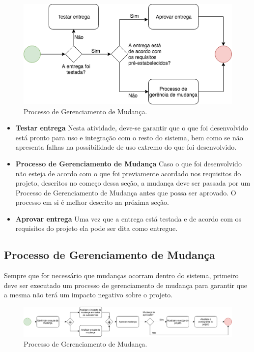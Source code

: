 \begin{figure}[!ht]
	\centering
		\includegraphics[scale=0.7]{figuras/entrega}
	\caption{Processo de Gerenciamento de Mudança.}
\end{figure}

\begin{itemize}
    \item \textbf{Testar entrega}
        Nesta atividade, deve-se garantir que o que foi desenvolvido está pronto para uso e integração com o resto do sistema, bem como se não apresenta falhas na possibilidade de uso extremo do que foi desenvolvido.

    \item \textbf{Processo de Gerenciamento de Mudança}
        Caso o que foi desenvolvido não esteja de acordo com o que foi previamente acordado nos requisitos do projeto, descritos no começo dessa seção, a mudança deve ser passada por um Processo de Gerenciamento de Mudança antes que possa ser aprovado. O processo em si é melhor descrito na próxima seção.

    \item \textbf{Aprovar entrega}
        Uma vez que a entrega está testada e de acordo com os requisitos do projeto ela pode ser dita como entregue.
\end{itemize}

\subsection{Processo de Gerenciamento de Mudança}
    Sempre que for necessário que mudanças ocorram dentro do sistema, primeiro deve ser executado um processo de gerenciamento de mudança para garantir que a mesma não terá um impacto negativo sobre o projeto.

\begin{figure}[!ht]
	\centering
		\includegraphics[scale=0.4]{figuras/mudanca}
	\caption{Processo de Gerenciamento de Mudança.}
\end{figure}

